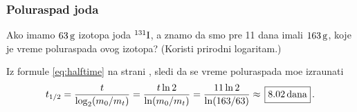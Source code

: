 \subsubsection{Poluraspad joda}

\zadatak {}
Ako imamo $63\,{\rm g}$ izotopa joda $\iso 131-I$, a znamo da smo pre 11 dana imali $163\,{\rm g}$, koje je vreme
poluraspada ovog izotopa? (Koristi prirodni logaritam.)

\resenje
Iz formule \eqref{eq:halftime} na strani \pageref{eq:halftime}, sledi da se vreme poluraspada
mo{\zv}e izra{\cv}unati
$$
\th
=\frac{t}{\logtwo(m_0 / m_t)}
=\frac{t\ln2}{\ln(m_0 / m_t)}
=\frac{11\ln2}{\ln(163/63)}
\approx\ram{8.02\um{dana}}.
$$
